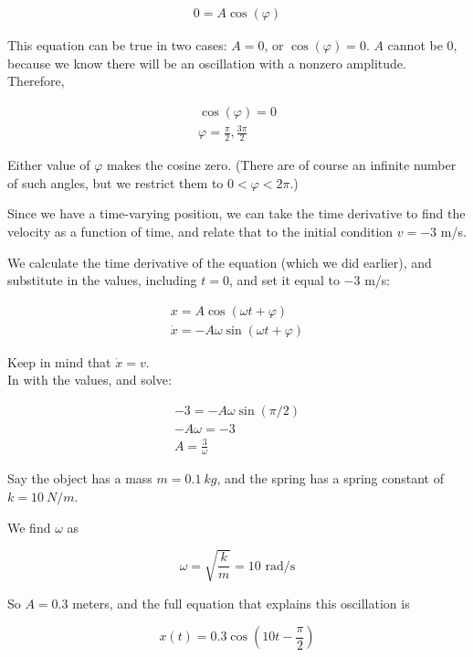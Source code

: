 \begin{align}
0 = A \cos(\varphi)
\end{align}

This equation can be true in two cases: $A = 0$, or $\cos(\varphi) = 0$. $A$ cannot be 0, because we know there will be an oscillation with a nonzero amplitude. Therefore,

\begin{align}
\cos(\varphi) = 0\\
\varphi = \frac{\pi}{2}, \frac{3\pi}{2}
\end{align}

Either value of $\varphi$ makes the cosine zero. (There are of course an infinite number of such angles, but we restrict them to $0 < \varphi < 2\pi$.)

Since we have a time-varying position, we can take the time derivative to find the velocity as a function of time, and relate that to the initial condition $v = -3$ m/s.

We calculate the time derivative of the equation (which we did earlier), and substitute in the values, including $t = 0$, and set it equal to $-3$ m/s:

\begin{align}
x = A \cos(\omega t + \varphi)\\
\dot{x} = -A \omega \sin(\omega t + \varphi)
\end{align}

Keep in mind that $\dot{x} = v$.\\
In with the values, and solve:

\begin{align}
-3 = -A \omega \sin(\pi/2)\\
-A \omega = -3\\
A = \frac{3}{\omega}
\end{align}

Say the object has a mass $m = \SI{0.1}{kg}$, and the spring has a spring constant of $k = \SI{10}{N/m}$.

We find $\omega$ as

\begin{equation}
\omega = \sqrt{\frac{k}{m}} = 10 \text{ rad/s}
\end{equation}

So $A = 0.3$ meters, and the full equation that explains this oscillation is

\begin{equation}
x(t) = 0.3 \cos(10 t - \frac{\pi}{2})
\end{equation}

